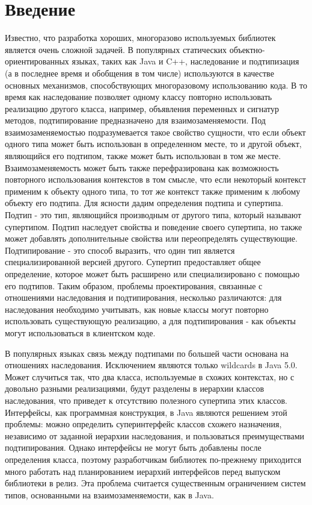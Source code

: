 \section{Введение}
\label{sec:Chapter0} 

Известно, что разработка хороших, многоразово используемых библиотек является очень сложной задачей.
В популярных статических объектно-ориентированных языках, таких как Java и C++, наследование и подтипизация
(а в последнее время и обобщения в том числе) используются в качестве основных механизмов, способствующих многоразовому
использованию кода.
В то время как наследование позволяет одному классу повторно использовать реализацию
другого класса, например, объявления переменных и сигнатур методов, подтипирование предназначено для взаимозаменяемости.
Под взаимозаменяемостью подразумевается такое свойство сущности, что если объект одного типа может быть использован в
определенном месте, то и другой объект, являющийся его подтипом, также может быть использован в том же месте.
Взаимозаменяемость может быть также перефразирована как возможность повторного использования контекстов в том смысле,
что если некоторый контекст применим к объекту одного типа, то тот же контекст также применим к любому объекту его подтипа.
Для ясности дадим определения подтипа и супертипа.
Подтип - это тип, являющийся производным от другого типа, который называют супертипом.
Подтип наследует свойства и поведение своего супертипа, но также может добавлять дополнительные свойства или
переопределять существующие.
Подтипирование - это способ выразить, что один тип является специализированной версией другого.
Супертип предоставляет общее определение, которое может быть расширено или специализировано с помощью его подтипов.
Таким образом, проблемы проектирования, связанные с отношениями наследования и подтипирования, несколько различаются:
для наследования необходимо учитывать, как новые классы могут повторно использовать существующую реализацию,
а для подтипирования - как объекты могут использоваться в клиентском коде.

В популярных языках связь между подтипами по большей части основана на отношениях наследования.
Исключением являются только wildcards в Java 5.0.
Может случиться так, что два класса, используемые в схожих контекстах, но с довольно разными реализациями,
будут разделены в иерархии классов наследования, что приведет к отсутствию полезного супертипа этих классов.
Интерфейсы, как программная конструкция, в Java являются решением этой проблемы: можно определить суперинтерфейс
классов схожего назначения, независимо от заданной иерархии наследования, и пользоваться преимуществами подтипирования.
Однако интерфейсы не могут быть добавлены после определения класса, поэтому разработчикам библиотек по-прежнему
приходится много работать над планированием иерархий интерфейсов перед выпуском библиотеки в релиз.
Эта проблема считается существенным ограничением систем типов, основанными на взаимозаменяемости, как в Java.

